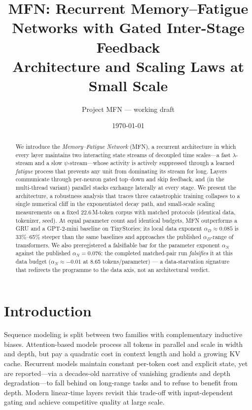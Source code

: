 \documentclass[11pt]{article}
\title{\vspace{-1.2em}MFN: Recurrent Memory--Fatigue Networks with Gated
Inter-Stage Feedback\\ \large Architecture and Scaling Laws at Small Scale}
\author{Project MFN --- working draft}
\date{\today}
\begin{document}
\maketitle

\begin{abstract}
We introduce the \emph{Memory--Fatigue Network} (MFN), a recurrent
architecture in which every layer maintains two interacting state streams of
decoupled time scales---a fast $\lambda$-stream and a slow $\psi$-stream---whose
activity is actively suppressed through a learned \emph{fatigue} process that
prevents any unit from dominating its stream for long. Layers communicate
through per-neuron gated top--down and skip feedback, and (in the multi-thread
variant) parallel stacks exchange laterally at every stage. We present the
architecture, a robustness analysis that traces three catastrophic training
collapses to a single numerical cliff in the exponentiated decay path, and
small-scale scaling measurements on a fixed 22.6\,M-token corpus with matched
protocols (identical data, tokenizer, seed). At equal parameter count and
identical budgets, MFN outperforms a GRU and a GPT-2-mini baseline on
TinyStories; its local data exponent $\alpha_D \approx 0.085$ is 33\%--65\%
steeper than the same baselines and approaches the published
$\alpha_D$-range of transformers. We also preregistered a falsifiable bar
for the parameter exponent $\alpha_N$ against the published $\alpha_N =
0.076$: the completed matched-pair run \emph{falsifies} it at this data
budget ($\alpha_N \approx -0.01$ at 8.65 tokens/parameter) --- a
data-starvation signature that redirects the programme to the data axis,
not an architectural verdict.
\end{abstract}

\section{Introduction}\label{sec:intro}
Sequence modeling is split between two families with complementary
inductive biases. Attention-based models
\citep{vaswani2017attention,radford2019language} process all tokens in
parallel and scale in width and depth, but pay a quadratic cost in context
length and hold a growing KV cache. Recurrent models \citep{hochreiter1997lstm,
cho2014gru} maintain constant per-token cost and explicit state, yet are
reported---via a decades-old narrative of vanishing gradients and depth
degradation---to fall behind on long-range tasks and to refuse to benefit
from depth. Modern linear-time layers
\citep{gu2023mamba,peng2023rwkv} revisit this trade-off with input-dependent
gating and achieve competitive quality at large scale.
\end{document}
